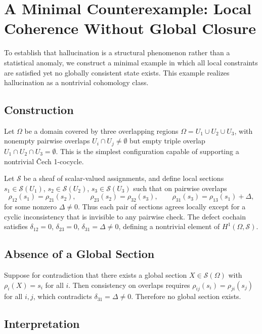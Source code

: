 \documentclass[11pt, oneside]{article}
\begin{document}
\section{A Minimal Counterexample: Local Coherence Without Global Closure}

To establish that hallucination is a structural phenomenon rather than a statistical anomaly, we construct a minimal example in which all local constraints are satisfied yet no globally consistent state exists. This example realizes hallucination as a nontrivial cohomology class.

\subsection{Construction}

Let $\Omega$ be a domain covered by three overlapping regions $\Omega = U_1 \cup U_2 \cup U_3$, with nonempty pairwise overlaps $U_i \cap U_j \neq \emptyset$ but empty triple overlap $U_1 \cap U_2 \cap U_3 = \emptyset$. This is the simplest configuration capable of supporting a nontrivial \v{C}ech 1-cocycle.

Let $\mathcal{S}$ be a sheaf of scalar-valued assignments, and define local sections $s_1 \in \mathcal{S}(U_1)$, $s_2 \in \mathcal{S}(U_2)$, $s_3 \in \mathcal{S}(U_3)$ such that on pairwise overlaps
\[
\rho_{12}(s_1) = \rho_{21}(s_2), \qquad \rho_{23}(s_2) = \rho_{32}(s_3), \qquad \rho_{31}(s_3) = \rho_{13}(s_1) + \Delta,
\]
for some nonzero $\Delta \neq 0$. Thus each pair of sections agrees locally except for a cyclic inconsistency that is invisible to any pairwise check. The defect cochain satisfies $\delta_{12} = 0$, $\delta_{23} = 0$, $\delta_{31} = \Delta \neq 0$, defining a nontrivial element of $H^1(\Omega, \mathcal{S})$.

\subsection{Absence of a Global Section}

Suppose for contradiction that there exists a global section $X \in \mathcal{S}(\Omega)$ with $\rho_i(X) = s_i$ for all $i$. Then consistency on overlaps requires $\rho_{ij}(s_i) = \rho_{ji}(s_j)$ for all $i,j$, which contradicts $\delta_{31} = \Delta \neq 0$. Therefore no global section exists.

\subsection{Interpretation}
\end{document}
